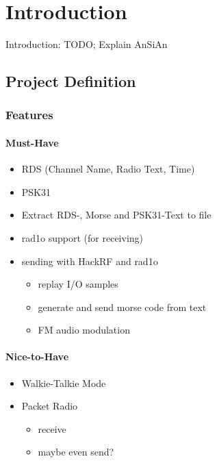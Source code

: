 \chapter{Introduction}\label{ch:introduction}
\glsresetall %

Introduction: TODO; Explain AnSiAn

\section{Project Definition}
\label{sec:project_definition}



\subsection{Features}

\subsubsection{Must-Have}
\begin{itemize}
	\item RDS (Channel Name, Radio Text, Time)
	\item PSK31
	\item Extract RDS-, Morse and PSK31-Text to file
	\item rad1o support (for receiving)
	\item sending with HackRF and rad1o
	\begin{itemize}
		\item replay I/O samples
		\item generate and send morse code from text
		\item FM audio modulation
	\end{itemize}
\end{itemize}

\subsubsection{Nice-to-Have}
\begin{itemize}
	\item Walkie-Talkie Mode
	\item Packet Radio
	\begin{itemize}
		\item receive
		\item maybe even send?
	\end{itemize}
\end{itemize}



